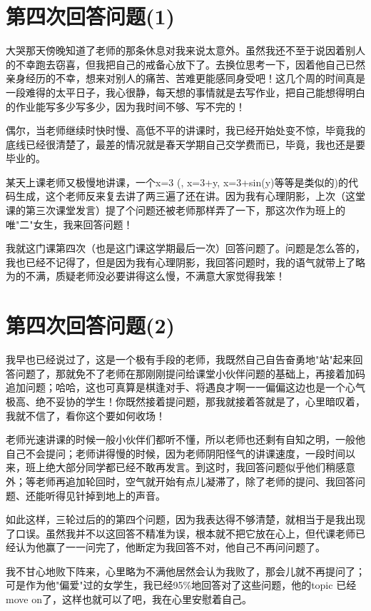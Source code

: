 \documentclass[12pt]{book}
\begin{document}
\section{第四次回答问题(1)}
\label{sec-5-1}

大哭那天傍晚知道了老师的那条休息对我来说太意外。虽然我还不至于说因着别人的不幸跑去窃喜，但我把自己的戒备心放下了。去换位思考一下，因着他自己已然亲身经历的不幸，想来对别人的痛苦、苦难更能感同身受吧！这几个周的时间真是一段难得的太平日子，我心很静，每天想的事情就是去写作业，把自己能想得明白的作业能写多少写多少，因为我时间不够、写不完的！

偶尔，当老师继续时快时慢、高低不平的讲课时，我已经开始处变不惊，毕竟我的底线已经很清楚了，最差的情况就是春天学期自己交学费而已，毕竟，我也还是要毕业的。

某天上课老师又极慢地讲课，一个x=3 (,  x=3+y, x=3+sin(y)等等是类似的)的代码生成，这个老师反来复去讲了两三遍了还在讲。因为我有心理阴影，上次（这堂课的第三次课堂发言）提了个问题还被老师那样弄了一下，那这次作为班上的唯"二"女生，我来回答问题！

我就这门课第四次（也是这门课这学期最后一次）回答问题了。问题是怎么答的，我也已经不记得了，但是因为我有心理阴影，我回答问题时，我的语气就带上了略为的不满，质疑老师没必要讲得这么慢，不满意大家觉得我笨！

\section{第四次回答问题(2)}
\label{sec-5-2}

我早也已经说过了，这是一个极有手段的老师，我既然自己自告奋勇地"站"起来回答问题了，那就免不了老师在那刚刚提问给课堂小伙伴问题的基础上，再接着加码追加问题；哈哈，这也可真算是棋逢对手、将遇良才啊一一偏偏这边也是一个心气极高、绝不妥协的学生！你既然接着提问题，那我就接着答就是了，心里暗叹着，我就不信了，看你这个要如何收场！

老师光速讲课的时候一般小伙伴们都听不懂，所以老师也还剩有自知之明，一般他自己不会提问；老师讲得慢的时候，因为老师阴阳怪气的讲课速度，一段时间以来，班上绝大部分同学都已经不敢再发言。到这时，我回答问题似乎他们稍感意外；等老师再追加轮回时，空气就开始有点儿凝滞了，除了老师的提问、我回答问题、还能听得见针掉到地上的声音。

如此这样，三轮过后的的第四个问题，因为我表达得不够清楚，就相当于是我出现了口误。虽然我并不以这回答不精准为误，根本就不把它放在心上，但代课老师已经认为他赢了一一问完了，他断定为我回答不对，他自己不再问问题了。

我不甘心地败下阵来，心里略为不满他居然会认为我败了，那会儿就不再提问了；可是作为他"偏爱"过的女学生，我已经95\%地回答对了这些问题，他的topic 已经move on了，这样也就可以了吧，我在心里安慰着自己。
\end{document}
